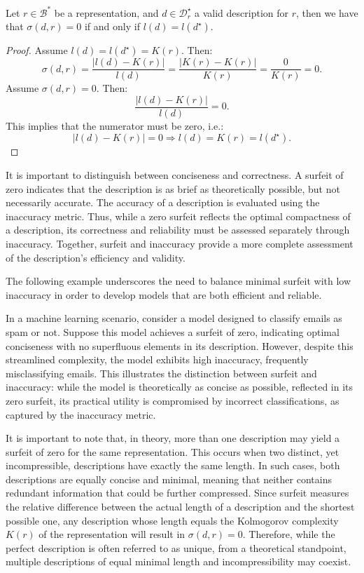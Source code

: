 \begin{proposition}
\label{prop:zero_surfeit}
Let $r \in \mathcal{B}^\ast$ be a representation, and $d \in \mathcal{D}^\star_r$ a valid description for $r$, then we have that  $\sigma(d, r) = 0$ if and only if $l(d) = l(d^\star)$.
\end{proposition}
\begin{proof}
Assume $l(d) = l(d^\star) = K(r)$. Then:
\[
\sigma(d, r) = \frac{ |l(d) - K(r)| }{ l(d) } = \frac{ |K(r) - K(r)| }{ K(r) } = \frac{0}{K(r)} = 0.
\]
Assume $\sigma(d, r) = 0$. Then:
\[
\frac{ |l(d) - K(r)| }{ l(d) } = 0.
\]
This implies that the numerator must be zero, i.e.:
\[
|l(d) - K(r)| = 0 \Rightarrow l(d) = K(r) = l(d^\star).
\]
\end{proof}

It is important to distinguish between conciseness and correctness. A surfeit of zero indicates that the description is as brief as theoretically possible, but not necessarily accurate. The accuracy of a description is evaluated using the inaccuracy metric. Thus, while a zero surfeit reflects the optimal compactness of a description, its correctness and reliability must be assessed separately through inaccuracy. Together, surfeit and inaccuracy provide a more complete assessment of the description's efficiency and validity.

The following example underscores the need to balance minimal surfeit with low inaccuracy in order to develop models that are both efficient and reliable.

\begin{example}
In a machine learning scenario, consider a model designed to classify emails as spam or not. Suppose this model achieves a surfeit of zero, indicating optimal conciseness with no superfluous elements in its description. However, despite this streamlined complexity, the model exhibits high inaccuracy, frequently misclassifying emails. This illustrates the distinction between surfeit and inaccuracy: while the model is theoretically as concise as possible, reflected in its zero surfeit, its practical utility is compromised by incorrect classifications, as captured by the inaccuracy metric. 
\end{example}

It is important to note that, in theory, more than one description may yield a surfeit of zero for the same representation. This occurs when two distinct, yet incompressible, descriptions have exactly the same length. In such cases, both descriptions are equally concise and minimal, meaning that neither contains redundant information that could be further compressed. Since surfeit measures the relative difference between the actual length of a description and the shortest possible one, any description whose length equals the Kolmogorov complexity $K(r)$ of the representation will result in $\sigma(d, r) = 0$. Therefore, while the perfect description is often referred to as unique, from a theoretical standpoint, multiple descriptions of equal minimal length and incompressibility may coexist.

